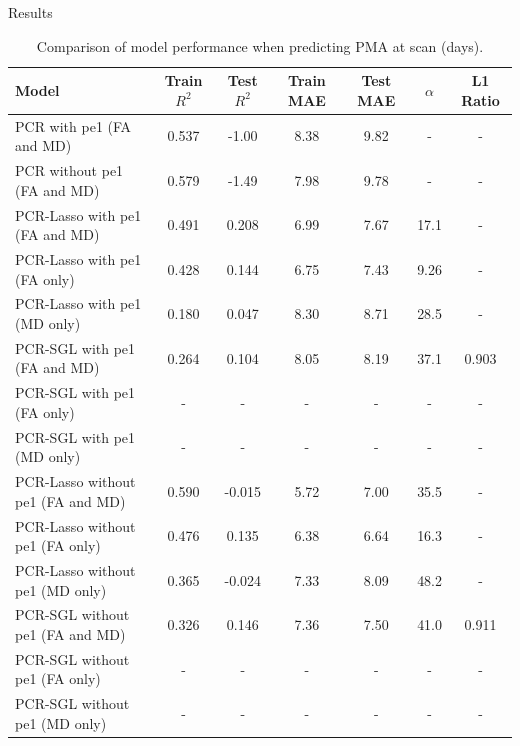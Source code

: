 \documentclass[final]{beamer}
\newlength{\colwidth}
\begin{document}
\begin{frame}[t]
\begin{columns}[t]
\begin{column}{\colwidth}
\begin{block}{Results}
    \begin{table}[ht]
      \centering
      \fontsize{8.5}{10}\selectfont
      \begin{tabularx}{\textwidth}{X c c c c c c}
        \toprule
        \textbf{Model} & \textbf{Train $R^2$} & \textbf{Test $R^2$} & \textbf{Train MAE} &
        \textbf{Test MAE} &
        \textbf{$\alpha$} &
        \textbf{L1 Ratio}\\
        \midrule
        PCR with pe1 (FA and MD) & 0.537 & -1.00 & 8.38 & 9.82 & - & - \\
        PCR without pe1 (FA and MD) & 0.579 & -1.49 & 7.98 & 9.78 & - & - \\
        \midrule
        PCR-Lasso with pe1 (FA and MD) & 0.491 & 0.208 & 6.99 & 7.67 & 17.1 & - \\
        PCR-Lasso with pe1 (FA only) & 0.428 & 0.144 & 6.75 & 7.43 & 9.26 & - \\
        PCR-Lasso with pe1 (MD only) & 0.180 & 0.047 & 8.30 & 8.71 & 28.5 & - \\
        \midrule
        PCR-SGL with pe1 (FA and MD) & 0.264 & 0.104 & 8.05 & 8.19 & 37.1 & 0.903 \\
        PCR-SGL with pe1 (FA only) & - & - & - & - & - & - \\
        PCR-SGL with pe1 (MD only) & - & - & - & - & - & - \\
        \midrule
        PCR-Lasso without pe1 (FA and MD) & 0.590 & -0.015 & 5.72 & 7.00 & 35.5 & - \\
        PCR-Lasso without pe1 (FA only) & 0.476 & 0.135 & 6.38 & 6.64 & 16.3 & - \\
        PCR-Lasso without pe1 (MD only) & 0.365 & -0.024 & 7.33 & 8.09 & 48.2 & - \\
        \midrule
        PCR-SGL without pe1 (FA and MD) & 0.326 & 0.146 & 7.36 & 7.50 & 41.0 & 0.911 \\
        PCR-SGL without pe1 (FA only) & - & - & - & - & - & - \\
        PCR-SGL without pe1 (MD only) & - & - & - & - & - & - \\
        \bottomrule
      \end{tabularx}
      \caption{Comparison of model performance when predicting PMA at scan (days).}
    \end{table}
    

\end{block}
\end{column}
\end{columns}
\end{frame}
\end{document}
